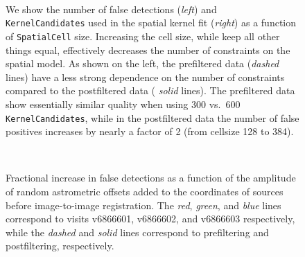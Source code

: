 \documentclass[prd, nofootinbib, floatfix, 11pt,tightenlines,times]{article}
\begin{document}
\begin{figure}
 \\
\caption{We show the number of false detections ({\it left}) and {\tt
    KernelCandidates} used in the spatial kernel fit ({\it right}) as
  a function of {\tt SpatialCell} size.  Increasing the cell size,
  while keep all other things equal, effectively decreases the number
  of constraints on the spatial model.  As shown on the left, the
  prefiltered data ({\it dashed} lines) have a less strong dependence
  on the number of constraints compared to the postfiltered data ({\it
    solid} lines).  The prefiltered data show essentially similar
  quality when using 300 vs.~600 {\tt KernelCandidates}, while in the
  postfiltered data the number of false positives increases by nearly
  a factor of 2 (from cellsize 128 to 384).  }
\label{cellsize}
\end{figure}

\begin{figure}
 \\
\caption{Fractional increase in false detections as a function of the
  amplitude of random astrometric offsets added to the coordinates of
  sources before image-to-image registration.  The {\it red}, {\it
    green}, and {\it blue} lines correspond to visits v6866601,
  v6866602, and v6866603 respectively, while the {\it dashed} and {\it
    solid} lines correspond to prefiltering and postfiltering,
  respectively.}
\label{wcsrms}
\end{figure}
\end{document}
